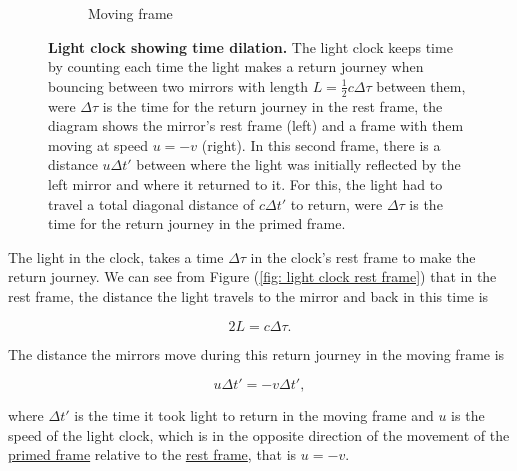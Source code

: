 \begin{figure}[H]
\begin{subfigure}{.49\textwidth}
		\caption{Moving frame}
	\end{subfigure}
	\caption{\textbf{Light clock showing time dilation.} The light clock keeps time by counting each time the light makes a return journey when bouncing between two mirrors with length ${L}=\frac{1}{2}{c}{\Delta \tau}$ between them, were ${\Delta\tau}$ is the time for the return journey in the rest frame, the diagram shows the mirror's rest frame (left) and a frame with them moving at speed ${u}=-{v}$ (right). In this second frame, there is a distance ${u}{\Delta t{'}}$ between where the light was initially reflected by the left mirror and where it returned to it. For this, the light had to travel a total diagonal distance of ${c}{\Delta t{'}}$ to return, were ${\Delta\tau}$ is the time for the return journey in the primed frame.}
	\label{fig: light clock}
\end{figure}

The light in the clock, takes a time ${\Delta\tau}$ in the clock's rest frame to make the return journey.
We can see from Figure (\ref{fig: light clock rest frame}) that in the rest frame, the distance the light travels to the mirror and back in this time is

\begin{equation}
	2{L} = {c}{\Delta\tau}.
\end{equation}

The distance the mirrors move during this return journey in the moving frame is

\begin{equation}
	{u}{\Delta t{'}} =-{v} {\Delta t{'}},
\end{equation}

where ${\Delta t{'}}$ is the time it took light to return in the moving frame and ${u}$ is the speed of the light clock, which is in the opposite direction of the movement of the \hyperlink{def-Primed-Frame}{primed frame} relative to the \hyperlink{def-proper-frame}{rest frame}, that is ${u} =-{v}$.

